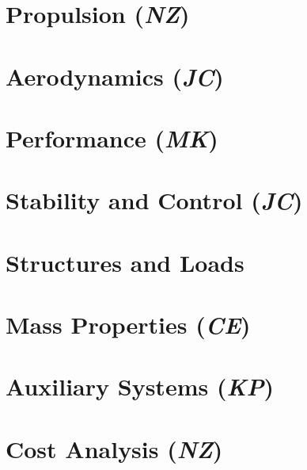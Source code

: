 \documentclass[conf]{new-aiaa}
\begin{document}
\clearpage
\section{Propulsion (\textit{NZ})}
\label{section: Propulsion}


\clearpage
\section{Aerodynamics (\textit{JC})}
\label{section: Aerodynamics}


\clearpage
\section{Performance (\textit{MK})}
\label{section: Performance}


\clearpage
\section{Stability and Control (\textit{JC})}
\label{section: Stab and Control}


\clearpage
\section{Structures and Loads}
\label{section: Structures and Loads}


\clearpage
\section{Mass Properties (\textit{CE})}
\label{section: Mass Properties}


%

\clearpage
\section{Auxiliary Systems (\textit{KP})}
\label{section: Systems}


\clearpage
\section{Cost Analysis (\textit{NZ})}    
\label{section: Cost}

\end{document}
